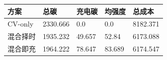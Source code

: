 \begin{tabular}{@{}lllll@{}}
\toprule
方案 & 总碳 & 充电碳 & 均强度 & 总成本\\
\midrule
CV-only & 2330.666 & 0.0 & 0.0 & 8182.371\\
混合择时 & 1935.232 & 49.657 & 52.84 & 6173.088\\
混合即充 & 1964.222 & 78.647 & 83.689 & 6174.547\\
\bottomrule
\end{tabular}
